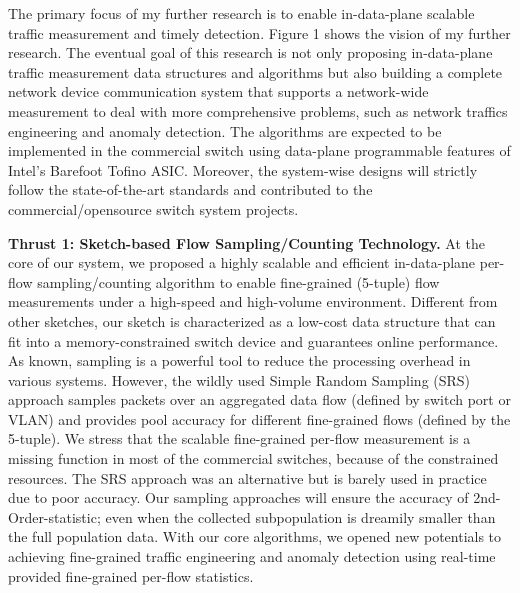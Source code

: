 \documentclass{NSF}
\newcommand{\BfPara}[1]{{\noindent\textbf{#1.}}\xspace}
\begin{document}
The primary focus of my further research is to enable in-data-plane scalable traffic measurement and timely detection. Figure 1 shows the vision of my further research. The eventual goal of this research is not only proposing in-data-plane traffic measurement data structures and algorithms but also building a complete network device communication system that supports a network-wide measurement to deal with more comprehensive problems, such as network traffics engineering and anomaly detection. The algorithms are expected to be implemented in the commercial switch using data-plane programmable features of Intel's Barefoot Tofino ASIC. Moreover, the system-wise designs will strictly follow the state-of-the-art standards and contributed to the commercial/opensource switch system projects. 



\BfPara{Thrust 1: Sketch-based Flow Sampling/Counting Technology}
At the core of our system, we proposed a highly scalable and efficient in-data-plane per-flow sampling/counting algorithm to enable fine-grained (5-tuple) flow measurements under a high-speed and high-volume environment. Different from other sketches, our sketch is characterized as a low-cost data structure that can fit into a memory-constrained switch device and guarantees online performance. As known, sampling is a powerful tool to reduce the processing overhead in various systems. However, the wildly used Simple Random Sampling (SRS) approach samples packets over an aggregated data flow (defined by switch port or VLAN) and provides pool accuracy for different fine-grained flows (defined by the 5-tuple). 
We stress that the scalable fine-grained per-flow measurement is a missing function in most of the commercial switches, because of the constrained resources. The SRS approach was an alternative but is barely used in practice due to poor accuracy. Our sampling approaches will ensure the accuracy of 2nd-Order-statistic; even when the collected subpopulation is dreamily smaller than the full population data. With our core algorithms, we opened new potentials to achieving fine-grained traffic engineering and anomaly detection using real-time provided fine-grained per-flow statistics. 
\end{document}
